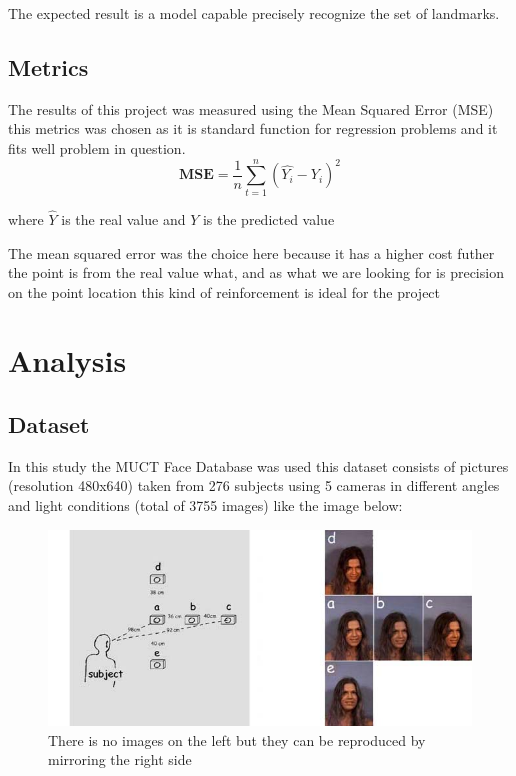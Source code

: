 \documentclass[11pt]{article}
\begin{document}
The expected result is a model capable precisely recognize the set of
landmarks.






\subsection{Metrics}
\label{sec:org41aca82}

The results of this project was measured using the Mean Squared Error (MSE) 
this metrics was chosen as it is standard function for regression problems
and it fits well problem in question.
 \begin{equation}
\mathbf{MSE} = \frac{1}{n}\sum_{t=1}^{n}(\hat{Y_i}-Y_i)^{2} 
 \end{equation}

where \(\displaystyle{\hat{Y}}\) is the real value and \(\displaystyle{Y}\) is
the predicted value

The mean squared error was the choice here because it has a higher cost
futher the point is from the real value what, and as what we are looking for
is precision on the point location this kind of reinforcement is ideal for
the project  

\section{Analysis}
\label{sec:org52f447f}

\subsection{Dataset}
\label{sec:org1a1aff5}
In this study the MUCT Face Database \cite{Milborrow10} was used
this dataset consists of pictures (resolution 480x640) taken from 276 subjects
using 5 cameras in different angles and light conditions (total of 3755
images) like the image below: 

\begin{figure}[htbp]
\centering
\includegraphics[width=.9\linewidth]{./images/muct-views-lores.jpg}
\caption{There is no images on the left but they can be reproduced by mirroring the right side}
\end{figure}
\end{document}

